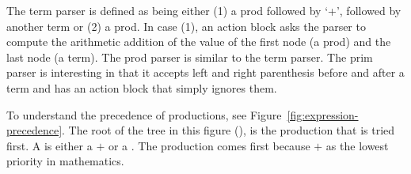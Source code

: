 \documentclass[a4paper,10pt,twoside]{book}
\begin{document}
The term parser is defined as being either (1) a prod followed by `+',
followed by another term or (2) a prod. In case (1), an action block
asks the parser to compute the arithmetic addition of the value of the
first node (a prod) and the last node (a term). The prod parser is
similar to the term parser. The prim parser is interesting in that it
accepts left and right parenthesis before and after a term and has an
action block that simply ignores them.

To understand the precedence of productions, see
Figure~\ref{fig:expression-precedence}. The root of the tree in this
figure (), is the production that is tried first. A 
is either a $+$ or a . The  production comes first
because $+$ as the lowest priority in mathematics.

\begin{figure}
  \centering
{}
\end{figure}
\end{document}
